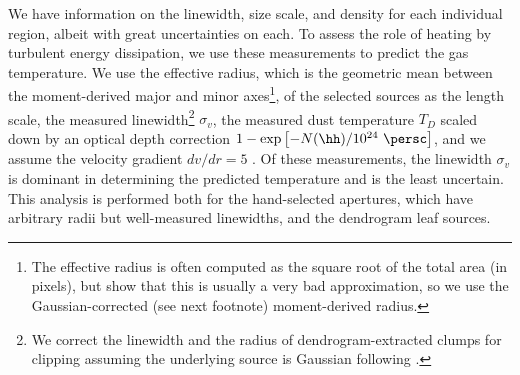 We have information on the linewidth, size scale, and density for each
individual region, albeit with great uncertainties on each. To assess the role
of heating by turbulent energy dissipation,  we use these measurements to
predict the gas temperature.  We use the effective radius,
which is the geometric mean between the moment-derived major and minor
axes\footnote{The effective radius is often computed as the square root of the
total area (in pixels), but \citet{Rosolowsky2006a} show that this is usually a
very bad approximation, so we use the Gaussian-corrected (see next footnote)
moment-derived radius.}, of the selected sources as the length scale, the
measured linewidth\footnote{We correct the linewidth and the radius of
dendrogram-extracted clumps for clipping assuming the underlying source is
Gaussian following \citet[][Appendix B]{Rosolowsky2005b}.}
$\sigma_v$, the
measured dust temperature $T_{D}$ scaled down by an optical depth correction
$1-\exp\left[-N(\hh)/10^{24}~\persc\right]$, and we assume the velocity gradient
$dv/dr = 5$ \kms \perpc.  Of these measurements, the linewidth $\sigma_v$ is
dominant in determining the predicted temperature and is the least uncertain.
This analysis is performed both for the hand-selected apertures, which have
arbitrary radii but well-measured linewidths, and the dendrogram leaf sources.

